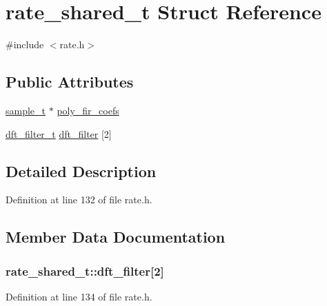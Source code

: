 \hypertarget{structrate__shared__t}{}\section{rate\+\_\+shared\+\_\+t Struct Reference}
\label{structrate__shared__t}


{\ttfamily \#include $<$rate.\+h$>$}

\subsection*{Public Attributes}
\begin{DoxyCompactItemize}
\item 
\hyperlink{soxr_8c_aeef50d4abead1cb3eef063fda4b721c0}{sample\+\_\+t} $\ast$ \hyperlink{structrate__shared__t_a1e41cf7aaf9fbb8b79616e2c18dac3f9}{poly\+\_\+fir\+\_\+coefs}
\item 
\hyperlink{structdft__filter__t}{dft\+\_\+filter\+\_\+t} \hyperlink{structrate__shared__t_a4593ff5b4b2faa35a8a3013e8fb12f20}{dft\+\_\+filter} \mbox{[}2\mbox{]}
\end{DoxyCompactItemize}


\subsection{Detailed Description}


Definition at line 132 of file rate.\+h.



\subsection{Member Data Documentation}
\subsubsection[{\texorpdfstring{dft\+\_\+filter}{dft_filter}}]{ rate\+\_\+shared\+\_\+t\+::dft\+\_\+filter\mbox{[}2\mbox{]}}\hypertarget{structrate__shared__t_a4593ff5b4b2faa35a8a3013e8fb12f20}{}\label{structrate__shared__t_a4593ff5b4b2faa35a8a3013e8fb12f20}


Definition at line 134 of file rate.\+h.

